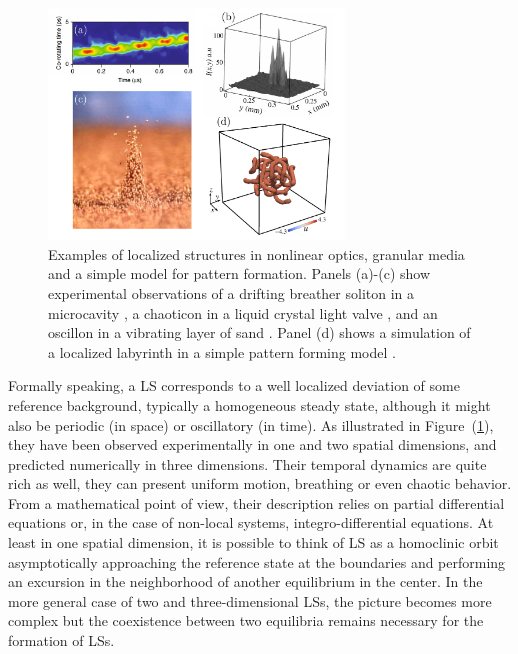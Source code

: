 \begin{figure}[h]
    \centering
    \includegraphics[width=0.7\textwidth]{imagenes/framework/LS/examples_ls.pdf}
    \caption{Examples of localized structures in nonlinear optics, granular media and a simple
    model for pattern formation. Panels (a)-(c) show experimental observations of a drifting breather
    soliton in a microcavity \cite{yi2018imaging}, a chaoticon in a liquid crystal light valve \cite{verschueren2013spatiotemporal}, and an oscillon in a vibrating
    layer of sand \cite{umbanhowar1996localized,aranson2006patterns}. Panel (d) shows a simulation of a localized labyrinth
    in a simple pattern forming model \cite{clerc2021localised, clerc2022localized}.}
    \label{fig:pre_ls_examplesls}
\end{figure}

Formally speaking, a LS corresponds to a well localized deviation of some reference background,
typically a homogeneous steady state, although it might also be periodic (in space) or oscillatory (in time).
As illustrated in Figure~(\ref{fig:pre_ls_examplesls}), they have been observed experimentally in one and two spatial dimensions, and predicted numerically in three dimensions.
Their temporal dynamics are quite rich as well, they can present uniform motion, breathing or even chaotic behavior.
From a mathematical point of view, their description relies on partial differential equations or,
in the case of non-local systems, integro-differential equations. At least in one spatial dimension,
it is possible to think of LS as a homoclinic orbit asymptotically approaching the reference state
at the boundaries and performing an excursion in the neighborhood of another equilibrium in the center.
In the more general case of two and three-dimensional LSs, the picture becomes more complex but the
coexistence between two equilibria remains necessary for the formation of LSs.

